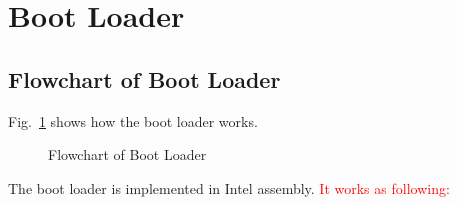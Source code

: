 \documentclass{swfcthesis}
\begin{document}
\section{Boot Loader}

\subsection{Flowchart of Boot Loader}
\label{sec:flowch-boot-load}

Fig.~\ref{fig:flowchart-of-boot-loader} shows how the boot loader works.
\begin{figure}[!ht]
  \centering
  \caption{Flowchart of Boot Loader}
  \label{fig:flowchart-of-boot-loader}
\end{figure}

The boot loader is implemented in Intel assembly. \textcolor{red}{It works as following:}
\end{document}
